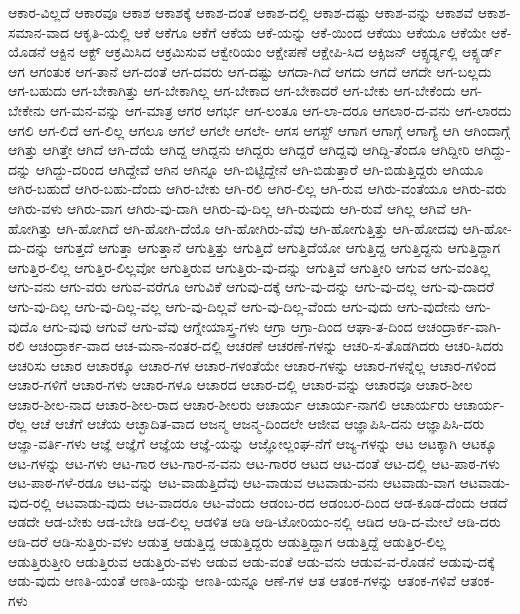 {ಆಕಾರ-ವಿಲ್ಲದೆ
ಆಕಾರವೂ
ಆಕಾಶ
ಆಕಾಶಕ್ಕೆ
ಆಕಾಶ-ದಂತೆ
ಆಕಾಶ-ದಲ್ಲಿ
ಆಕಾಶ-ದಷ್ಟು
ಆಕಾಶ-ವನ್ನು
ಆಕಾಶವೆ
ಆಕಾಶ-ಸಮಾನ-ವಾದ
ಆಕೃತಿ-ಯಲ್ಲಿ
ಆಕೆ
ಆಕೆಗೂ
ಆಕೆಗೆ
ಆಕೆಯ
ಆಕೆ-ಯನ್ನು
ಆಕೆ-ಯಿಂದ
ಆಕೆಯು
ಆಕೆಯೂ
ಆಕೆಯೇ
ಆಕೆ-ಯೊಡನೆ
ಆಕ್ಟಿನ
ಆಕ್ಟ್
ಆಕ್ರಮಿಸಿದ
ಆಕ್ರಮಿಸುವ
ಆಕ್ವೇರಿಯಂ
ಆಕ್ಷೇಪಣೆ
ಆಕ್ಷೇಪಿ-ಸಿದ
ಆಕ್ಸಿಜನ್
ಆಕ್ಸ್ಫರ್ಡ್ನಲ್ಲಿ
ಆಕ್ಸ್ಫರ್ಡ್
ಆಗ
ಆಗಂತುಕ
ಆಗ-ತಾನೆ
ಆಗ-ದಂತೆ
ಆಗ-ದವರು
ಆಗ-ದಷ್ಟು
ಆಗದಾ-ಗಿದೆ
ಆಗದು
ಆಗದೆ
ಆಗದೇ
ಆಗ-ಬಲ್ಲದು
ಆಗ-ಬಹುದು
ಆಗ-ಬೇಕಾಗಿತ್ತು
ಆಗ-ಬೇಕಾಗಿಲ್ಲ
ಆಗ-ಬೇಕಾದ
ಆಗ-ಬೇಕಾದರೆ
ಆಗ-ಬೇಕು
ಆಗ-ಬೇಕೆಂದು
ಆಗ-ಬೇಕೇನು
ಆಗ-ಮನ-ವನ್ನು
ಆಗ-ಮಾತ್ರ
ಆಗರ
ಆಗರ್ಭ
ಆಗ-ಲಂತೂ
ಆಗ-ಲಾ-ದರೂ
ಆಗಲಾರ-ದ-ವನು
ಆಗ-ಲಾರದು
ಆಗಲಿ
ಆಗ-ಲಿದೆ
ಆಗ-ಲಿಲ್ಲ
ಆಗಲೂ
ಆಗಲೆ
ಆಗಲೇ
ಆಗಲೇ-
ಆಗಸ
ಆಗಸ್ಟ್
ಆಗಾಗ
ಆಗಾಗ್ಗೆ
ಆಗಾಗ್ಯೆ
ಆಗಿ
ಆಗಿಂದಾಗ್ಗೆ
ಆಗಿತ್ತು
ಆಗಿತ್ತೇ
ಆಗಿದೆ
ಆಗಿ-ದೆಯೆ
ಆಗಿದ್ದ
ಆಗಿದ್ದನು
ಆಗಿದ್ದರು
ಆಗಿದ್ದರೆ
ಆಗಿದ್ದವು
ಆಗಿದ್ದಿ-ತೆಂದೂ
ಆಗಿದ್ದೀರಿ
ಆಗಿದ್ದು-ದನ್ನು
ಆಗಿದ್ದು-ದರಿಂದ
ಆಗಿದ್ದೇವೆ
ಆಗಿನ
ಆಗಿನ್ನೂ
ಆಗಿ-ಬಿಟ್ಟಿದ್ದೇನೆ
ಆಗಿ-ಬಿಡುತ್ತಾರೆ
ಆಗಿ-ಬಿಡುತ್ತಿದ್ದರು
ಆಗಿಯೂ
ಆಗಿರ-ಬಹುದೆ
ಆಗಿರ-ಬಹು-ದೆಂದು
ಆಗಿರ-ಬೇಕು
ಆಗಿ-ರಲಿ
ಆಗಿರ-ಲಿಲ್ಲ
ಆಗಿ-ರುವ
ಆಗಿರು-ವಂತೆಯೂ
ಆಗಿರು-ವರು
ಆಗಿರು-ವಳು
ಆಗಿರು-ವಾಗ
ಆಗಿರು-ವು-ದಾಗಿ
ಆಗಿರು-ವು-ದಿಲ್ಲ
ಆಗಿ-ರುವುದು
ಆಗಿ-ರುವೆ
ಆಗಿಲ್ಲ
ಆಗಿವೆ
ಆಗಿ-ಹೋಗಿತ್ತು
ಆಗಿ-ಹೋಗಿದೆ
ಆಗಿ-ಹೋಗಿ-ದೆಯೊ
ಆಗಿ-ಹೋಗಿರು-ವೆವು
ಆಗಿ-ಹೋಗುತ್ತಿತ್ತು
ಆಗಿ-ಹೋದವು
ಆಗಿ-ಹೋ-ದು-ದನ್ನು
ಆಗುತ್ತದೆ
ಆಗುತ್ತಾ
ಆಗುತ್ತಾನೆ
ಆಗುತ್ತಿತ್ತು
ಆಗುತ್ತಿದೆ
ಆಗುತ್ತಿದೆಯೋ
ಆಗುತ್ತಿದ್ದ
ಆಗುತ್ತಿದ್ದನು
ಆಗುತ್ತಿದ್ದಾಗ
ಆಗುತ್ತಿರ-ಲಿಲ್ಲ
ಆಗುತ್ತಿರ-ಲಿಲ್ಲವೋ
ಆಗುತ್ತಿರುವ
ಆಗುತ್ತಿರು-ವು-ದನ್ನು
ಆಗುತ್ತಿವೆ
ಆಗುತ್ತೀರಿ
ಆಗುವ
ಆಗು-ವಂತಿಲ್ಲ
ಆಗು-ವನು
ಆಗು-ವರು
ಆಗುವ-ವರೆಗೂ
ಆಗುವಿಕೆ
ಆಗುವು-ದಕ್ಕೆ
ಆಗು-ವು-ದನ್ನು
ಆಗು-ವು-ದಲ್ಲ
ಆಗು-ವು-ದಾದರೆ
ಆಗು-ವು-ದಿಲ್ಲ
ಆಗು-ವು-ದಿಲ್ಲ-ವಲ್ಲ
ಆಗು-ವು-ದಿಲ್ಲವೆ
ಆಗು-ವು-ದಿಲ್ಲ-ವೆಂದು
ಆಗು-ವುದು
ಆಗು-ವುದೇನು
ಆಗು-ವುದೊ
ಆಗು-ವುವು
ಆಗುವೆ
ಆಗು-ವೆವು
ಆಗ್ನೇಯಾಸ್ತ್ರ-ಗಳು
ಆಗ್ರಾ
ಆಗ್ರಾ-ದಿಂದ
ಆಘಾ-ತ-ದಿಂದ
ಆಚಂದ್ರಾರ್ಕ-ವಾಗಿ-ರಲಿ
ಆಚಂದ್ರಾರ್ಕ-ವಾದ
ಆಚ-ಮನಾ-ನಂತರ-ದಲ್ಲಿ
ಆಚರಣೆ
ಆಚರಣೆ-ಗಳನ್ನು
ಆಚರಿ-ಸ-ತೊಡಗಿದರು
ಆಚರಿ-ಸಿದರು
ಆಚರಿಸು
ಆಚಾರ
ಆಚಾರಕ್ಕೂ
ಆಚಾರ-ಗಳ
ಆಚಾರ-ಗಳಂತೆಯೇ
ಆಚಾರ-ಗಳನ್ನು
ಆಚಾರ-ಗಳನ್ನೆಲ್ಲ
ಆಚಾರ-ಗಳಿಂದ
ಆಚಾರ-ಗಳಿಗೆ
ಆಚಾರ-ಗಳು
ಆಚಾರ-ಗಳೂ
ಆಚಾರದ
ಆಚಾರ-ದಲ್ಲಿ
ಆಚಾರ-ವನ್ನು
ಆಚಾರವೂ
ಆಚಾರ-ಶೀಲ
ಆಚಾರ-ಶೀಲ-ನಾದ
ಆಚಾರ-ಶೀಲ-ರಾದ
ಆಚಾರ-ಶೀಲರು
ಆಚಾರ್ಯ
ಆಚಾರ್ಯ-ನಾಗಲಿ
ಆಚಾರ್ಯರು
ಆಚಾರ್ಯ-ರೆಲ್ಲ
ಆಚೆ
ಆಚೆಗೆ
ಆಚೆಯ
ಆಚ್ಛಾದಿತ-ವಾದ
ಆಜನ್ಮ
ಆಜನ್ಮ-ದಿಂದಲೇ
ಆಜೀವ
ಆಜ್ಞಾಪಿಸಿ-ದನು
ಆಜ್ಞಾಪಿಸಿ-ದರು
ಆಜ್ಞಾ-ವರ್ತಿ-ಗಳು
ಆಜ್ಞೆ
ಆಜ್ಞೆಗೆ
ಆಜ್ಞೆಯ
ಆಜ್ಞೆ-ಯನ್ನು
ಆಜ್ಞೋಲ್ಲಂಘ-ನೆಗೆ
ಆಜ್ಯ-ಗಳನ್ನು
ಆಟ
ಆಟಕ್ಕಾಗಿ
ಆಟಕ್ಕೂ
ಆಟ-ಗಳನ್ನು
ಆಟ-ಗಳು
ಆಟ-ಗಾರ
ಆಟ-ಗಾರ-ನ-ವನು
ಆಟ-ಗಾರರ
ಆಟದ
ಆಟ-ದಂತೆ
ಆಟ-ದಲ್ಲಿ
ಆಟ-ಪಾಠ-ಗಳು
ಆಟ-ಪಾಠ-ಗಳೆ-ರಡೂ
ಆಟ-ವನ್ನು
ಆಟ-ವಾಡುತ್ತಿದೆವು
ಆಟ-ವಾಡುವ
ಆಟವಾಡು-ವನು
ಆಟವಾಡು-ವಾಗ
ಆಟವಾಡು-ವುದ-ರಲ್ಲಿ
ಆಟವಾಡು-ವುದು
ಆಟ-ವಾದರೂ
ಆಟ-ವೆಂದು
ಆಡಂಬ-ರದ
ಆಡಂಬರ-ದಿಂದ
ಆಡ-ಕೂಡ-ದೆಂದು
ಆಡದೆ
ಆಡದೇ
ಆಡ-ಬೇಕು
ಆಡ-ಬೇಡಿ
ಆಡ-ಲಿಲ್ಲ
ಆಡಳಿತ
ಆಡಿ
ಆಡಿ-ಟೋರಿಯಂ-ನಲ್ಲಿ
ಆಡಿದ
ಆಡಿ-ದ-ಮೇಲೆ
ಆಡಿ-ದರು
ಆಡಿ-ದರೆ
ಆಡಿ-ಸುತ್ತಿರು-ವಳು
ಆಡುತ್ತ
ಆಡುತ್ತಿದ್ದ
ಆಡುತ್ತಿದ್ದರು
ಆಡುತ್ತಿದ್ದಾಗ
ಆಡುತ್ತಿದ್ದೆ
ಆಡುತ್ತಿರ-ಲಿಲ್ಲ
ಆಡುತ್ತಿರುತ್ತೀರಿ
ಆಡುತ್ತಿರುವ
ಆಡುತ್ತಿರು-ವಳು
ಆಡುವ
ಆಡು-ವಂತೆ
ಆಡು-ವನು
ಆಡುವ-ವ-ರೊಡನೆ
ಆಡುವು-ದಕ್ಕೆ
ಆಡು-ವುದು
ಆಣತಿ-ಯಂತೆ
ಆಣತಿ-ಯನ್ನು
ಆಣತಿ-ಯನ್ನೂ
ಆಣೆ-ಗಳ
ಆತ
ಆತಂಕ-ಗಳನ್ನು
ಆತಂಕ-ಗಳಿವೆ
ಆತಂಕ-ಗಳು
}
